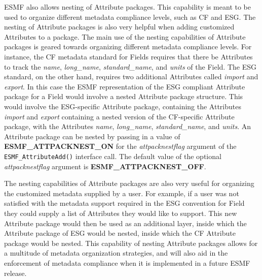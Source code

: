 \vspace{18pt}

ESMF also allows nesting of Attribute packages.  This capability is meant to be used to organize different metadata compliance levels, such as CF and ESG.  The nesting of Attribute packages is also very helpful when adding customized Attributes to a package.  The main use of the nesting capabilities of Attribute packages is geared towards organizing different metadata compliance levels.  For instance, the CF metadata standard for Fields requires that there be Attributes to track the {\it name}, {\it long\_name}, {\it standard\_name}, and {\it units} of the Field.  The ESG standard, on the other hand, requires two additional Attributes called {\it import} and {\it export}.  In this case the ESMF representation of the ESG compliant Attribute package for a Field would involve a nested Attribute package structure.  This would involve the ESG-specific Attribute package, containing the Attributes {\it import} and {\it export} containing a nested version of the CF-specific Attribute package, with the Attributes {\it name}, {\it long\_name}, {\it standard\_name}, and {\it units}.  An Attribute package can be nested by passing in a value of {\bf ESMF\_ATTPACKNEST\_ON} for the {\it attpacknestflag} argument of the {\tt ESMF\_AttributeAdd()} interface call.  The default value of the optional {\it attpacknestflag} argument is {\bf ESMF\_ATTPACKNEST\_OFF}.

The nesting capabilities of Attribute packages are also very useful for organizing the customized metadata supplied by a user.  For example, if a user was not satisfied with the metadata support required in the ESG convention for Field they could supply a list of Attributes they would like to support.  This new Attribute package would then be used as an additional layer, inside which the Attribute package of ESG would be nested, inside which the CF Attribute package would be nested.  This capability of nesting Attribute packages allows for a multitude of metadata organization strategies, and will also aid in the enforcement of metadata compliance when it is implemented in a future ESMF release.




